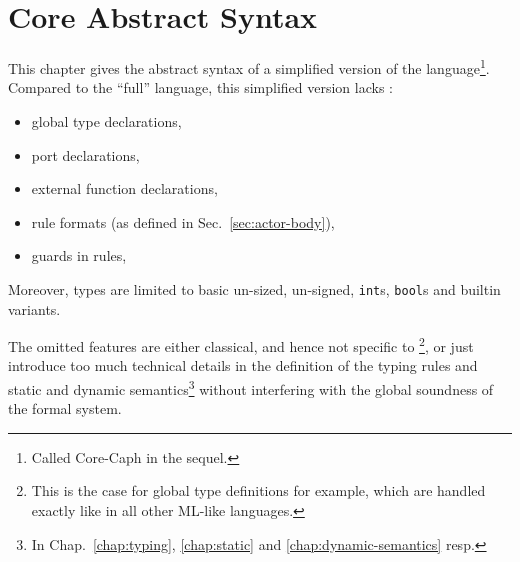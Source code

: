 
\chapter{Core Abstract Syntax}
\label{chap:abssyn}

\newcommand{\tm}[1]{\mathtt{#1}}
\newcommand{\ut}[1]{\emph{#1}}
\newcommand{\cat}[1]{\text{#1}}

This chapter gives the abstract syntax of a simplified version of the \caph language\footnote{
  Called Core-Caph in the sequel.}. Compared to the ``full'' \caph language, this simplified version
lacks :

\begin{itemize}
\item global type declarations,
\item port declarations,
\item external function declarations,
\item rule formats (as defined in Sec.~\ref{sec:actor-body}), 
\item guards in rules,
\end{itemize}

Moreover, types are limited to basic un-sized, un-signed, \texttt{int}s, 
  \texttt{bool}s and builtin variants.  

The omitted features are either classical, and
hence not specific to \caph\footnote{This is the case for global type definitions for example, which
  are handled exactly like in all other ML-like languages.}, or just introduce too
much technical details in the definition of the typing rules and static and dynamic
semantics\footnote{In Chap.~\ref{chap:typing}, \ref{chap:static} and \ref{chap:dynamic-semantics}
  resp.} without interfering with the global soundness of the formal system.


